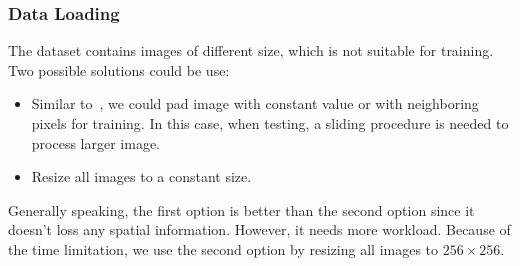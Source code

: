 \documentclass[runningheads]{llncs}
\begin{document}
\subsubsection{Data Loading}
The dataset contains images of different size, which is not suitable for training. Two possible solutions could be use:
\begin{itemize}
	\item Similar to~\cite{ronneberger2015u}, we could pad image with constant value or with neighboring pixels for training. In this case, when testing, a sliding procedure is needed to process larger image. 
	\item Resize all images to a constant size.
\end{itemize}
Generally speaking, the first option is better than the second option since it doesn't loss any spatial information. However, it needs more workload. Because of the time limitation, we use the second option by resizing all images to $256\times 256$.
\end{document}
